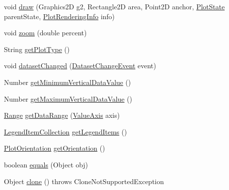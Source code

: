 \begin{DoxyCompactItemize}
\item 
void \mbox{\hyperlink{classorg_1_1jfree_1_1chart_1_1plot_1_1_thermometer_plot_a8d5c0c667c02b8ce4db1f8e55ace5cb0}{draw}} (Graphics2D g2, Rectangle2D area, Point2D anchor, \mbox{\hyperlink{classorg_1_1jfree_1_1chart_1_1plot_1_1_plot_state}{Plot\+State}} parent\+State, \mbox{\hyperlink{classorg_1_1jfree_1_1chart_1_1plot_1_1_plot_rendering_info}{Plot\+Rendering\+Info}} info)
\item 
void \mbox{\hyperlink{classorg_1_1jfree_1_1chart_1_1plot_1_1_thermometer_plot_a50925b54c9d1e3ca80edd9d03969d00d}{zoom}} (double percent)
\item 
String \mbox{\hyperlink{classorg_1_1jfree_1_1chart_1_1plot_1_1_thermometer_plot_af5f898b94a9f7e6c2df5e502260f90c7}{get\+Plot\+Type}} ()
\item 
void \mbox{\hyperlink{classorg_1_1jfree_1_1chart_1_1plot_1_1_thermometer_plot_aba0587d6e40888042aef46c570fc1237}{dataset\+Changed}} (\mbox{\hyperlink{classorg_1_1jfree_1_1data_1_1general_1_1_dataset_change_event}{Dataset\+Change\+Event}} event)
\item 
Number \mbox{\hyperlink{classorg_1_1jfree_1_1chart_1_1plot_1_1_thermometer_plot_a8c56ec9f1cf9292da982e31aa59a6704}{get\+Minimum\+Vertical\+Data\+Value}} ()
\item 
Number \mbox{\hyperlink{classorg_1_1jfree_1_1chart_1_1plot_1_1_thermometer_plot_abb6f97feaded1bc12aceddcfa4b1d07d}{get\+Maximum\+Vertical\+Data\+Value}} ()
\item 
\mbox{\hyperlink{classorg_1_1jfree_1_1data_1_1_range}{Range}} \mbox{\hyperlink{classorg_1_1jfree_1_1chart_1_1plot_1_1_thermometer_plot_a7521168336c8233ccb78d493a5612b81}{get\+Data\+Range}} (\mbox{\hyperlink{classorg_1_1jfree_1_1chart_1_1axis_1_1_value_axis}{Value\+Axis}} axis)
\item 
\mbox{\hyperlink{classorg_1_1jfree_1_1chart_1_1_legend_item_collection}{Legend\+Item\+Collection}} \mbox{\hyperlink{classorg_1_1jfree_1_1chart_1_1plot_1_1_thermometer_plot_a36b314aaada1e777a33202d88c1f9bba}{get\+Legend\+Items}} ()
\item 
\mbox{\hyperlink{classorg_1_1jfree_1_1chart_1_1plot_1_1_plot_orientation}{Plot\+Orientation}} \mbox{\hyperlink{classorg_1_1jfree_1_1chart_1_1plot_1_1_thermometer_plot_a12bb9968d853a440fd272506f58d83db}{get\+Orientation}} ()
\item 
boolean \mbox{\hyperlink{classorg_1_1jfree_1_1chart_1_1plot_1_1_thermometer_plot_aacb2f73cebd02e31e47b6a7715ac7063}{equals}} (Object obj)
\item 
Object \mbox{\hyperlink{classorg_1_1jfree_1_1chart_1_1plot_1_1_thermometer_plot_a778b1859c334f6e1d630fb6fb5380535}{clone}} ()  throws Clone\+Not\+Supported\+Exception 

\end{DoxyCompactItemize}

